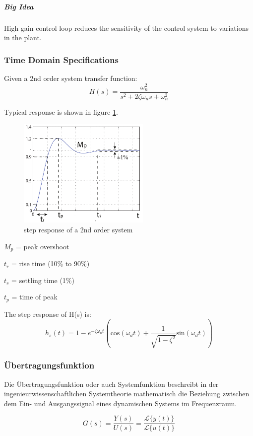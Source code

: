 \subparagraph{Big Idea} High gain control loop reduces the sensitivity of
the control system to variations in the plant.

\subsubsection{Time Domain Specifications}
Given a 2nd order system transfer function:
$$H(s)=\frac{\omega ^2 _n}{s^2+2\zeta \omega _n s + \omega ^2 _n} $$

Typical response is shown in figure \ref{fig_step_response}.
\begin{figure}
  \centering
  \includegraphics[width=2.5in]{fig/cntr_step.png}
  \caption{step response of a 2nd order system}\label{fig_step_response}
\end{figure}

$M_p$ = peak overshoot

$t_r$ = rise time (10\% to 90\%)

$t_s$ = settling time (1\%)

$t_p$ = time of peak

The step response of H(s) is:
$$h_s(t)=1-e^{-\zeta \omega _n t}(\textrm{cos}(\omega _d t) + \frac{1}{\sqrt{1-\zeta ^2 }}\textrm{sin}(\omega _d t))$$

\subsubsection{Übertragungsfunktion}
Die Übertragungsfunktion oder auch Systemfunktion beschreibt in der ingenieurwissenschaftlichen Systemtheorie mathematisch die Beziehung zwischen dem Ein- und Ausgangssignal eines dynamischen Systems im Frequenzraum.

$$G(s) = \frac{Y(s)}{U(s)} = \frac{\mathcal L \{ y(t) \} }{\mathcal L\{ u(t) \} }$$

%
%

